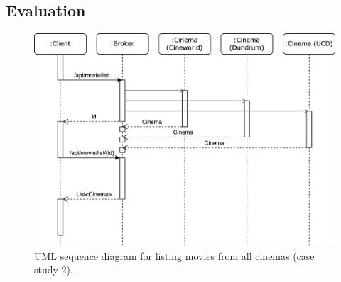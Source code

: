 \subsection{Evaluation}

\begin{figure}[H]
  \centering
  \includegraphics[width=0.75\linewidth]{./assets/diagrams/cs02-sequence.png}
  \caption{UML sequence diagram for listing movies from all cinemas (case study 2).}
  \label{fig:cs02-sequence}
\end{figure}
